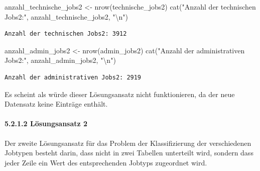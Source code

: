 \documentclass[
  letterpaper,
  DIV=11,
  numbers=noendperiod]{scrartcl}
\let\oldparagraph\paragraph
\renewcommand{\paragraph}[1]{\oldparagraph{#1}\mbox{}}
\newenvironment{Shaded}{\begin{snugshade}}{\end{snugshade}}
\newcommand{\FunctionTok}[1]{\textcolor[rgb]{0.28,0.35,0.67}{#1}}
\newcommand{\NormalTok}[1]{\textcolor[rgb]{0.00,0.23,0.31}{#1}}
\newcommand{\OtherTok}[1]{\textcolor[rgb]{0.00,0.23,0.31}{#1}}
\newcommand{\SpecialCharTok}[1]{\textcolor[rgb]{0.37,0.37,0.37}{#1}}
\newcommand{\StringTok}[1]{\textcolor[rgb]{0.13,0.47,0.30}{#1}}
\begin{document}
\begin{Shaded}
\begin{Highlighting}[]
\NormalTok{anzahl\_technische\_jobs2 }\OtherTok{\textless{}{-}} \FunctionTok{nrow}\NormalTok{(technische\_jobs2)}
\FunctionTok{cat}\NormalTok{(}\StringTok{"Anzahl der technischen Jobs2:"}\NormalTok{, anzahl\_technische\_jobs2, }\StringTok{"}\SpecialCharTok{\textbackslash{}n}\StringTok{"}\NormalTok{)}
\end{Highlighting}
\end{Shaded}

\begin{verbatim}
Anzahl der technischen Jobs2: 3912 
\end{verbatim}

\begin{Shaded}
\begin{Highlighting}[]
\NormalTok{anzahl\_admin\_jobs2 }\OtherTok{\textless{}{-}} \FunctionTok{nrow}\NormalTok{(admin\_jobs2)}
\FunctionTok{cat}\NormalTok{(}\StringTok{"Anzahl der administrativen Jobs2:"}\NormalTok{, anzahl\_admin\_jobs2, }\StringTok{"}\SpecialCharTok{\textbackslash{}n}\StringTok{"}\NormalTok{)}
\end{Highlighting}
\end{Shaded}

\begin{verbatim}
Anzahl der administrativen Jobs2: 2919 
\end{verbatim}

Es scheint als würde dieser Lösungsansatz nicht funktionieren, da der
neue Datensatz keine Einträge enthält.

\hypertarget{luxf6sungsansatz-2}{%
\paragraph{5.2.1.2 Lösungsansatz 2}\label{luxf6sungsansatz-2}}

Der zweite Lösungsansatz für das Problem der Klassifizierung der
verschiedenen Jobtypen besteht darin, dass nicht in zwei Tabellen
unterteilt wird, sondern dass jeder Zeile ein Wert des entsprechenden
Jobtyps zugeordnet wird.
\end{document}
